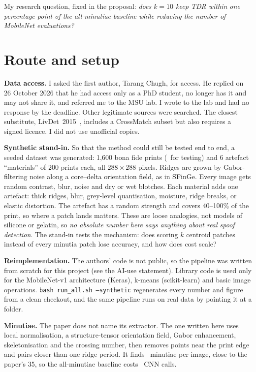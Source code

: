 \IfFileExists{IEEEtran.cls}{\documentclass[conference]{IEEEtran}}{\documentclass[twocolumn,10pt]{article}}
\begin{document}
My research question, fixed in the proposal: \emph{does $k=10$ keep TDR within one percentage point of
the all-minutiae baseline while reducing the number of MobileNet evaluations?}

\section{Route and setup}
\textbf{Data access.} I asked the first author, Tarang Chugh, for access. He replied on 26 October 2026
that he had access only as a PhD student, no longer has it and may not share it, and referred me to the
MSU lab. I wrote to the lab and had no response by the deadline. Other legitimate sources were
searched. The closest substitute, LivDet~2015~\cite{livdet}, includes a CrossMatch subset but
also requires a signed licence. I did not use unofficial copies.

\textbf{Synthetic stand-in.} So that the method could still be tested end to end, a seeded
dataset was generated: 1,600 bona fide prints (\NTestBona\ for testing) and 6 artefact ``materials'' of 200 prints
each, all $288\times288$ pixels. Ridges are grown by Gabor-filtering noise along a core--delta
orientation field, as in SFinGe. Every image gets random contrast, blur, noise and dry or wet blotches.
Each material adds one artefact: thick ridges, blur, grey-level quantisation, moisture, ridge breaks, or
elastic distortion. The artefact has a random strength and covers 40--100\% of the print, so where a
patch lands matters. These are loose analogies, not models of silicone or gelatin, so \emph{no absolute
number here says anything about real spoof detection}. The stand-in tests the mechanism: does scoring
$k$ centroid patches instead of every minutia patch lose accuracy, and how does cost scale?

\textbf{Reimplementation.} The authors' code is not public, so the pipeline was written from scratch for
this project (see the AI-use statement). Library code is used only for the MobileNet-v1 architecture (Keras),
k-means (scikit-learn) and basic image operations. \texttt{bash run\_all.sh --synthetic} regenerates
every number and figure from a clean checkout, and the same pipeline runs on real data by pointing it at
a folder.

\textbf{Minutiae.} The paper does not name its extractor. The one written here uses local normalisation, a
structure-tensor orientation field, Gabor enhancement, skeletonisation and the crossing number, then
removes points near the print edge and pairs closer than one ridge period. It finds \MinutiaeMean\
minutiae per image, close to the paper's 35, so the all-minutiae baseline costs \CallsAll\ CNN calls.
\end{document}
